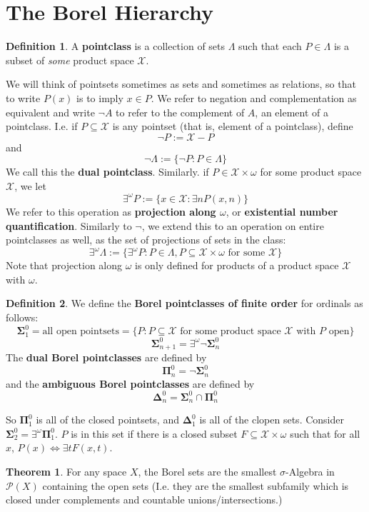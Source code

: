 \documentclass{article}
\theoremstyle{definition}
\newtheorem{definition}{Definition}[section]
\newtheorem{theorem}{Theorem}[section]
\theoremstyle{plain}
\begin{document}
\section{The Borel Hierarchy}
\begin{definition}
A \textbf{pointclass} is a collection of sets $\Lambda$ such that each $P \in \Lambda$ is a subset of \textit{some} product space $\mathcal{X}$.  
\end{definition}
We will think of pointsets sometimes as sets and sometimes as relations, so that to write $P(x)$ is to imply $x \in P$. We refer to negation and complementation as equivalent and write $\neg A$ to refer to the complement of $A$, an element of a pointclass. I.e. if $P \subseteq \mathcal{X}$ is any pointset (that is, element of a pointclass), define 
\[ \neg P := \mathcal{X}-P \]
and 
\[ \neg \Lambda := \{ \neg P: P \in \Lambda \} \]
We call this the \textbf{dual pointclass}. Similarly. if $P \in \mathcal{X} \times \omega$ for some product space $\mathcal{X}$, we let
\[ \exists^{\omega}P := \{x \in \mathcal{X}: \exists n P(x,n)\}\]
We refer to this operation as \textbf{projection along $\omega$}, or \textbf{existential number quantification}. Similarly to $\neg$, we extend this to an operation on entire pointclasses as well, as the set of projections of sets in the class:
\[\exists^{\omega}\Lambda := \{\exists^{\omega} P: P \in \Lambda, P \subseteq \mathcal{X} \times \omega \textrm{ for some } \mathcal{X}\} \]
Note that projection along $\omega$ is only defined for products of a product space $\mathcal{X}$ with $\omega$.
\begin{definition}
    We define the \textbf{Borel pointclasses of finite order} for ordinals as follows:
       \[ \bm{\Sigma}_1^0 = \textrm{all open pointsets} = \{P: P \subseteq \mathcal{X} \textrm{ for some product space } \mathcal{X} \textrm{ with $P$ open} \} \]
       \[  \bm{\Sigma}_{n+1}^0 = \exists^{\omega}\neg \bm{\Sigma}_n^0 \]
       The \textbf{dual Borel pointclasses} are defined by 
       \[ \bm{\Pi}_n^0 = \neg \bm{\Sigma}_n^0 \]
       and the \textbf{ambiguous Borel pointclasses} are defined by
       \[ \bm{\Delta}_n^0 = \bm{\Sigma}_n^0 \cap \bm{\Pi}_n^0 \]
\end{definition}
So $\bm{\Pi}_1^0$ is all of the closed pointsets, and $\bm{\Delta}_1^0$ is all of the clopen sets. Consider $\bm{\Sigma}_2^0 = \exists^{\omega} \bm{\Pi}_1^0$. $P$ is in this set if there is a closed subset $F \subseteq \mathcal{X} \times \omega$ such that for all $x$, $P(x) \iff \exists t F(x,t)$. 
\begin{theorem}
	For any space $X$, the Borel sets are the smallest $\sigma$-Algebra in $\mathcal{P}(X)$ containing the open sets (I.e. they are the smallest subfamily which is closed under complements and countable unions/intersections.)
\end{theorem}
\end{document}
